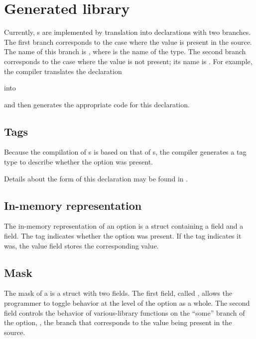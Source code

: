 \section{Generated library}
\label{sec:opts-library}
Currently, \Popt{}s are implemented by translation into \Punion{}
declarations with two branches.  The first branch corresponds to the
case where the value is present in the source. The name of this branch
is , where  is the name of the \Popt{}
type.  The second branch corresponds to the case where the value is
not present; its name is .  For example, the
\pads{} compiler translates the \Popt{} declaration

%
\noindent
into

%
\noindent
and then generates the appropriate code for this declaration.

\subsection{Tags}
\label{sec:opts-tags}
Because the compilation of \Popt{}s is based on that of \Punion{}s,
the \pads{} compiler generates a tag type to describe whether the
option was present.  

%
\noindent
Details about the form of this declaration may be found in
. 

\subsection{In-memory representation}
\label{sec:opts-rep}
The in-memory representation of an option is a \C{} struct containing
a  field and a  field.  The tag indicates whether the
option was present.  If the tag indicates it was, the value field
stores the corresponding value. 

\subsection{Mask}
\label{sec:opts-masks}
The mask of a \Popt{} is a \C{} struct with two fields.
The first field, called , allows the programmer to
toggle behavior at the level of the option as a whole.  The second
field controls the behavior of various-library functions on the
``some'' branch of the option, \ie{}, the branch that corresponds to
the value being present in the source.

